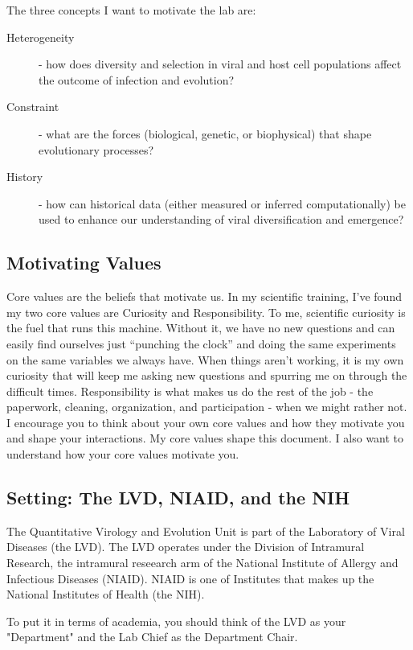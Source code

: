 \documentclass[10pt, a4paper, twocolumn]{article} %
\begin{document}
The three concepts I want to motivate the lab are:
\begin{description}
	\item [Heterogeneity] - how does diversity and selection in viral and host cell populations affect the outcome of infection and evolution?
	\item [Constraint] - what are the forces (biological, genetic, or biophysical) that shape evolutionary processes?
	\item [History] - how can historical data (either measured or inferred computationally) be used to enhance our understanding of viral diversification and emergence?
\end{description}
\subsection{Motivating Values}
Core values are the beliefs that motivate us. In my scientific training, I’ve found my two core values are Curiosity and Responsibility. To me, scientific curiosity is the fuel that runs this machine. Without it, we have no new questions and can easily find ourselves just “punching the clock” and doing the same experiments on the same variables we always have. When things aren’t working, it is my own curiosity that will keep me asking new questions and spurring me on through the difficult times. Responsibility is what makes us do the rest of the job - the paperwork, cleaning, organization, and participation - when we might rather not. I encourage you to think about your own core values and how they motivate you and shape your interactions. My core values shape this document. I also want to understand how your core values motivate you.
\subsection{Setting: The LVD, NIAID, and the NIH}
The Quantitative Virology and Evolution Unit is part of the Laboratory of Viral Diseases (the LVD). The LVD operates under the Division of Intramural Research, the intramural reseearch arm of the National Institute of Allergy and Infectious Diseases (NIAID). NIAID is one of Institutes that makes up the National Institutes of Health (the NIH).

To put it in terms of academia, you should think of the LVD as your "Department" and the Lab Chief as the Department Chair.
\end{document}

